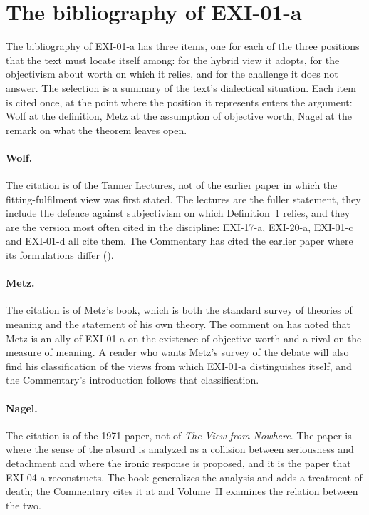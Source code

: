 \section{The bibliography of EXI-01-a}\label{s:bib}

The bibliography of EXI-01-a has three items, one for each of the three positions that the text must locate itself among: \citet{Wolf2010} for the hybrid view it adopts, \citet{Metz2013} for the objectivism about worth on which it relies, and \citet{Nagel1971} for the challenge it does not answer. The selection is a summary of the text's dialectical situation. Each item is cited once, at the point where the position it represents enters the argument: Wolf at the definition, Metz at the assumption of objective worth, Nagel at the remark on what the theorem leaves open.

\paragraph{Wolf.} The citation is of the Tanner Lectures, not of the earlier paper \citep{Wolf1997} in which the fitting-fulfilment view was first stated. The lectures are the fuller statement, they include the defence against subjectivism on which Definition~1 relies, and they are the version most often cited in the discipline: EXI-17-a, EXI-20-a, EXI-01-c and EXI-01-d all cite them. The Commentary has cited the earlier paper where its formulations differ ().

\paragraph{Metz.} The citation is of Metz's book, which is both the standard survey of theories of meaning and the statement of his own theory. The comment on  has noted that Metz is an ally of EXI-01-a on the existence of objective worth and a rival on the measure of meaning. A reader who wants Metz's survey of the debate will also find his classification of the views from which EXI-01-a distinguishes itself, and the Commentary's introduction follows that classification.

\paragraph{Nagel.} The citation is of the 1971 paper, not of \emph{The View from Nowhere}. The paper is where the sense of the absurd is analyzed as a collision between seriousness and detachment and where the ironic response is proposed, and it is the paper that EXI-04-a reconstructs. The book generalizes the analysis and adds a treatment of death; the Commentary cites it at  and Volume~II examines the relation between the two.

